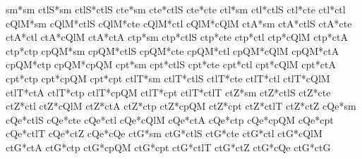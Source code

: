                                    sm*sm             ctlS*sm           ctlS*ctlS              cte*sm            cte*ctlS             cte*cte              ctl*sm            ctl*ctlS             ctl*cte             ctl*ctl             cQlM*sm           cQlM*ctlS            cQlM*cte            cQlM*ctl           cQlM*cQlM              ctA*sm            ctA*ctlS             ctA*cte             ctA*ctl            ctA*cQlM             ctA*ctA              ctp*sm            ctp*ctlS             ctp*cte             ctp*ctl            ctp*cQlM             ctp*ctA             ctp*ctp             cpQM*sm           cpQM*ctlS            cpQM*cte            cpQM*ctl           cpQM*cQlM            cpQM*ctA            cpQM*ctp           cpQM*cpQM              cpt*sm            cpt*ctlS             cpt*cte             cpt*ctl            cpt*cQlM             cpt*ctA             cpt*ctp            cpt*cpQM             cpt*cpt             ctlT*sm           ctlT*ctlS            ctlT*cte            ctlT*ctl           ctlT*cQlM            ctlT*ctA            ctlT*ctp           ctlT*cpQM            ctlT*cpt           ctlT*ctlT              ctZ*sm            ctZ*ctlS             ctZ*cte             ctZ*ctl            ctZ*cQlM             ctZ*ctA             ctZ*ctp            ctZ*cpQM             ctZ*cpt            ctZ*ctlT             ctZ*ctZ              cQe*sm            cQe*ctlS             cQe*cte             cQe*ctl            cQe*cQlM             cQe*ctA             cQe*ctp            cQe*cpQM             cQe*cpt            cQe*ctlT             cQe*ctZ             cQe*cQe              ctG*sm            ctG*ctlS             ctG*cte             ctG*ctl            ctG*cQlM             ctG*ctA             ctG*ctp            ctG*cpQM             ctG*cpt            ctG*ctlT             ctG*ctZ             ctG*cQe             ctG*ctG
